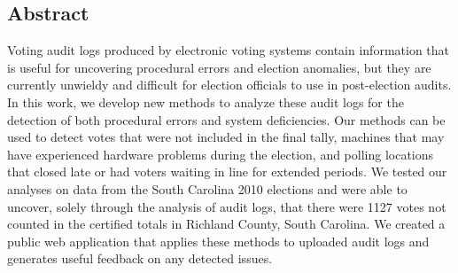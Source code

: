 
\subsection*{Abstract}
Voting audit logs produced by electronic voting systems contain
information that is useful for uncovering procedural errors and
election anomalies, but they are currently unwieldy and difficult for
election officials to use in post-election audits. In this work, we
develop new methods to analyze these audit logs for the
detection of both procedural errors and system deficiencies. Our
methods can be used to detect votes that were not included in the
final tally, machines that may have experienced hardware problems
during the election, and polling locations that closed late or had
voters waiting in line for extended periods. We tested our analyses on
data from the South Carolina 2010 elections and were able to uncover, 
solely through the analysis of audit logs, that there were 1127 votes
not counted in the certified totals in Richland County, South
Carolina. We created a public web application that applies these
methods to uploaded audit logs and generates useful feedback on any
detected issues. 


